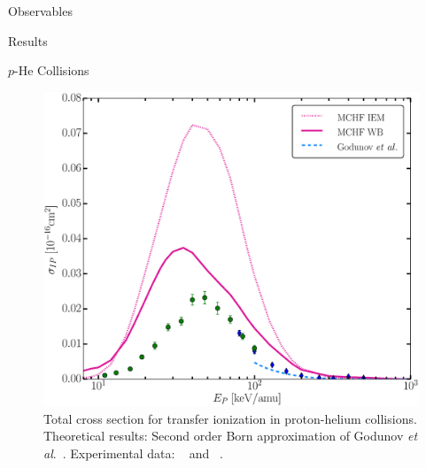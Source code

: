\documentclass[letterpaper, 11 pt]{report}
\begin{document}
\begin{chapter}{Observables \label{chap:p-he2p-he}}
\begin{section}{Results \label{sec:phe2p-res}}
\begin{subsection}{\texorpdfstring{$p$}{p}-He Collisions \label{sec:phe-res}}
\begin{figure}[ht]
\begin{minipage}{.49\linewidth}
               \centering
               \includegraphics[width = \linewidth]{./images/phe/phe-IP.eps}
               \caption[Total cross section for transfer ionization in proton-helium collisions.]
                       {Total cross section for transfer ionization in proton-helium collisions.
                        Theoretical results: Second order Born approximation of Godunov
                        \textit{et al}.~\cite{Godunov-06}. Experimental data:
                        {\color{OliveGreen}{$\bullet$}}~\cite{SG89} and
                        {\color{blue}{$\blacklozenge$}}~\cite{SG85}. \label{fig:phe-ip}}
            \end{minipage}
         \end{figure}

         \begin{figure}[ht]
            \begin{minipage}{.49\linewidth}
               

\end{minipage}
\end{figure}
\end{subsection}
\end{section}
\end{chapter}
\end{document}
